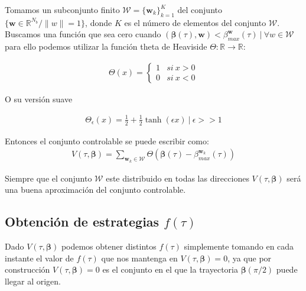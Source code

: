 Tomamos un subconjunto finito $\mathcal{W} =\{\bm{w}_k\}_{k=1}^K $ del conjunto $ \{\bm{w} \in \mathbb{R}^{N_b} / \| w\| = 1 \}$, donde $K$ es el número de elementos del conjunto $\mathcal{W}$. Buscamos una función que sea cero cuando  $(\bm{\beta}(\tau),\bm{w}) < \beta^{\bm{w}}_{max}(\tau) \ | \ \forall w \in \mathcal{W}$ para ello podemos utilizar la función theta de Heaviside $\Theta: \mathbb{R} \rightarrow \mathbb{R}$:

\begin{gather}
    \Theta(x) = \begin{cases}
        1 & si \ x > 0 \\ 
        0 & si \ x < 0
    \end{cases}
\end{gather}

O su versión suave 

\begin{gather}
    \Theta_\epsilon(x) = \frac{1}{2} + \frac{1}{2} \tanh(\epsilon x) \ | \ \epsilon >> 1
\end{gather}

Entonces el conjunto controlable se puede escribir como:
\begin{gather}
    V(\tau,\bm{\beta}) = \sum_{\bm{w}_k \in \mathcal{W}} 
    \Theta (\bm{\beta}(\tau) - \beta_{max}^{\bm{w}_k}(\tau))
\end{gather}

Siempre que el conjunto $\mathcal{W}$ este distribuido en todas las direcciones $V(\tau,\bm{\beta})$ será una buena aproximación del conjunto controlable.

\subsection{Obtención de estrategias $f(\tau)$}

Dado $V(\tau,\bm{\beta})$ podemos obtener distintos $f(\tau)$ simplemente tomando en cada instante el valor de $f(\tau)$ que nos mantenga en $V(\tau,\bm{\beta}) = 0$, ya que por construcción $V(\tau,\bm{\beta}) = 0$ es el conjunto en el que la trayectoria $\bm{\beta}(\pi/2)$ puede llegar al origen.